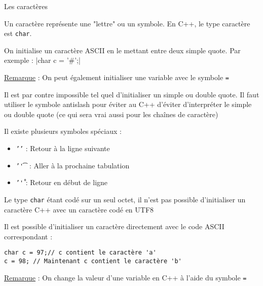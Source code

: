 \documentclass[compress,10pt,aspectratio=169]{beamer}
\begin{document}
\begin{frame}[fragile]{Les caractères}
    \scriptsize

    Un caractère représente une "lettre" ou un symbole. En C++, le type caractère est \texttt{char}.

    On initialise un caractère ASCII en le mettant entre deux simple quote. Par exemple :
    |char c = '#';|

    \underline{Remarque} : On peut également initialiser une variable avec le symbole \texttt{=}

    Il est par contre impossible tel quel d'initialiser un simple ou double quote. Il faut utiliser le symbole antislash
    pour éviter au C++ d'éviter d'interpréter le simple ou double quote (ce qui sera vrai aussi pour les chaînes de caractère)

    Il existe plusieurs symboles spéciaux :
    \begin{multicols}{3}
    \begin{itemize}
    \item \texttt{'\n'} : Retour à la ligne suivante
    \item \texttt{'\t'} : Aller à la prochaine tabulation
    \item \texttt{'\r'} : Retour en début de ligne 
    \end{itemize}
    \end{multicols}

    Le type \texttt{char} étant codé sur un seul octet, il n'est pas possible d'initialiser un caractère C++ avec un caractère codé en UTF8

    Il est possible d'initialiser un caractère directement avec le code ASCII correspondant :
    \begin{verbatim}
char c = 97;// c contient le caractère 'a'
c = 98; // Maintenant c contient le caractère 'b'
\end{verbatim}

    \underline{Remarque} : On change la valeur d'une variable en C++ à l'aide du symbole \texttt{=}
\end{frame}
\end{document}
